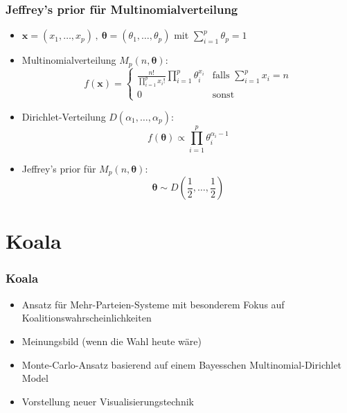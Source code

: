 \documentclass[aspectratio=169,xcolor=dvipsnames]{beamer}
\begin{document}
\begin{frame}
\frametitle{Jeffrey's prior für Multinomialverteilung}
\begin{itemize}
	\item<1-> $\boldsymbol{x}=(x_1,\dots,x_p)\,,~\boldsymbol{\theta}=(\theta_1,\dots,\theta_p)$ mit $\sum_{i=1}^p\theta_p = 1$
	\item<2-> Multinomialverteilung $M_p(n,\boldsymbol{\theta})$: $$f(\boldsymbol{x})=\left\{\begin{array}{ll}
	\frac{n!}{\prod_{i=1}^{p}x_i!}\prod_{i=1}^{p}\theta_i^{x_i} & \text{falls }\sum_{i=1}^{p}x_i=n\\
	0 & \text{sonst}
	\end{array}\right.$$
	\item<3-> Dirichlet-Verteilung $D(\alpha_1,\dots,\alpha_p)$: $$f(\boldsymbol{\theta})\propto\prod_{i=1}^{p}\theta_i^{\alpha_i-1}$$
	\item<4-> Jeffrey's prior für $M_p(n,\boldsymbol{\theta})$:
	$$\boldsymbol{\theta}\sim D\left(\frac{1}{2},\dots,\frac{1}{2}\right)$$
\end{itemize}
\end{frame}

\section{Koala}

\begin{frame}
	\frametitle{Koala}
	\begin{itemize}
		\item Ansatz für Mehr-Parteien-Systeme mit besonderem Fokus auf Koalitionswahrscheinlichkeiten
		\item Meinungsbild (wenn die Wahl heute wäre) 
		\item Monte-Carlo-Ansatz basierend auf einem Bayesschen Multinomial-Dirichlet Model
		\item Vorstellung neuer Visualisierungstechnik
	\end{itemize}
\end{frame}
\end{document}
